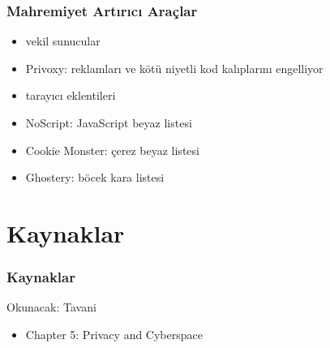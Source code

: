 \documentclass[dvipsnames]{beamer}
\theoremstyle{plain}
\begin{document}
\begin{frame}
  \frametitle{Mahremiyet Artırıcı Araçlar}

  \begin{itemize}
    \item vekil sunucular
    \item Privoxy: reklamları ve kötü niyetli kod kalıplarını engelliyor

    \pause
    \medskip
    \item tarayıcı eklentileri
    \item NoScript: JavaScript beyaz listesi
    \item Cookie Monster: çerez beyaz listesi
    \item Ghostery: böcek kara listesi
  \end{itemize}
\end{frame}

\section*{Kaynaklar}

\begin{frame}
  \frametitle{Kaynaklar}

  \begin{block}{Okunacak: Tavani}
    \begin{itemize}
      \item Chapter 5: \alert{Privacy and Cyberspace}
    \end{itemize}
  \end{block}
\end{frame}
\end{document}
